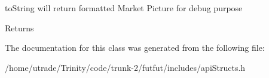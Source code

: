 to\-String will return formatted Market Picture for debug purpose 

\begin{DoxyReturn}{Returns}

\end{DoxyReturn}


The documentation for this class was generated from the following file\-:\begin{DoxyCompactItemize}
\item 
/home/utrade/\-Trinity/code/trunk-\/2/futfut/includes/api\-Structs.\-h\end{DoxyCompactItemize}
